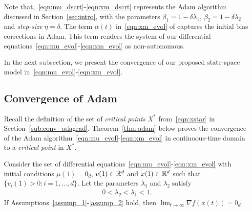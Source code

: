 Note that,~\eqref{eqn:mu_dscrt}-\eqref{eqn:xm_dscrt} represents the Adam algorithm discussed in Section~\ref{sec:intro}, with the parameters $\beta_1 = 1-\delta\lambda_1$, $\beta_2 = 1-\delta\lambda_2$ and {\em step-size} $\eta = \delta$. The term $\alpha(t)$ in~\eqref{eqn:xm_evol} of captures the initial bias corrections in Adam. This term renders the system of our differential equations~\eqref{eqn:mu_evol}-\eqref{eqn:xm_evol} as non-autonomous.

In the next subsection, we present the convergence of our proposed state-space model in~\eqref{eqn:mu_evol}-\eqref{eqn:xm_evol}.


\subsection{Convergence of Adam}
\label{sub:conv_adam}

Recall the definition of the set of {\em critical points} $X^*$ from~\eqref{eqn:xstar} in Section~\ref{sub:conv_adagrad}.
Theorem~\ref{thm:adam} below proves the convergence of the Adam algorithm~\eqref{eqn:mu_evol}-\eqref{eqn:xm_evol} in continuous-time domain to a {\em critical point} in $X^*$.


\begin{theorem} \label{thm:adam}
Consider the set of differential equations~\eqref{eqn:mu_evol}-\eqref{eqn:xm_evol} with initial conditions $\mu(1) = 0_d$, $v(1) \in \mathbb{R}^d$ and $x(1) \in \mathbb{R}^d$ such that $\{v_i(1) > 0 : i = 1,\ldots,d\}$. Let the parameters $\lambda_1$ and $\lambda_2$ satisfy
\begin{align}
    0 < \lambda_2 < \lambda_1 < 1. \label{eqn:lambda_cond}
\end{align}
If Assumptions~\ref{assump_1}-\ref{assump_2} hold, then $\lim_{t \to \infty} \nabla f(x(t)) = 0_d$.
\end{theorem}

